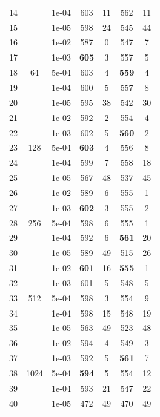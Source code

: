 \documentclass[times,twocolumn,final,authoryear]{elsarticle}
\begin{document}
\begin{table}[h!]
{\begin{tabular}{c|c|c|c|c|c|c}
			14 &                     & 1e-04 & 603 & 11 & 562 & 11\\
			15 &                     & 1e-05 & 598 & 24 & 545 & 44\\
			\hline
			16 & \multirow{5}{*}{64} & 1e-02 & 587 & 0 & 547 & 7\\
			17 &                     & 1e-03 & \textbf{605} & 3 & 557 & 5\\
			18 &                     & 5e-04 & 603 & 4 & \textbf{559} & 4\\
			19 &                     & 1e-04 & 600 & 5 & 557 & 8\\
			20 &                     & 1e-05 & 595 & 38 & 542 & 30\\
			\hline
			21 & \multirow{5}{*}{128} & 1e-02 & 592 & 2 & 554 & 4\\
			22 &                      & 1e-03 & 602 & 5 & \textbf{560} & 2\\
			23 &                      & 5e-04 & \textbf{603} & 4 & 556 & 8\\
			24 &                      & 1e-04 & 599 & 7 & 558 & 18\\
			25 &                      & 1e-05 & 567 & 48 & 537 & 45\\
			\hline
			26 & \multirow{5}{*}{256} & 1e-02 & 589 & 6 & 555 & 1\\
			27 &                      & 1e-03 & \textbf{602} & 3 & 555 & 2\\
			28 &                      & 5e-04 & 598 & 6 & 555 & 1\\
			29 &                      & 1e-04 & 592 & 6 & \textbf{561} & 20\\
			30 &                      & 1e-05 & 589 & 49 & 515 & 26\\
			\hline
			31 & \multirow{5}{*}{512} & 1e-02 & \textbf{601} & 16 & \textbf{555} & 1\\
			32 &                      & 1e-03 & 601 & 5 & 548 & 5\\
			33 &                      & 5e-04 & 598 & 3 & 554 & 9\\
			34 &                      & 1e-04 & 598 & 15 & 548 & 19\\
			35 &                      & 1e-05 & 563 & 49 & 523 & 48\\
			\hline
			36 & \multirow{5}{*}{1024} & 1e-02 & 594 & 4 & 549 & 3\\
			37 &                       & 1e-03 & 592 & 5 & \textbf{561} & 7\\
			38 &                       & 5e-04 & \textbf{594} & 5 & 554 & 12\\
			39 &                       & 1e-04 & 593 & 21 & 547 & 22\\
			40 &                       & 1e-05 & 472 & 49 & 470 & 49\\
			\hline			
		\end{tabular}
	}
\end{table}
\end{document}
